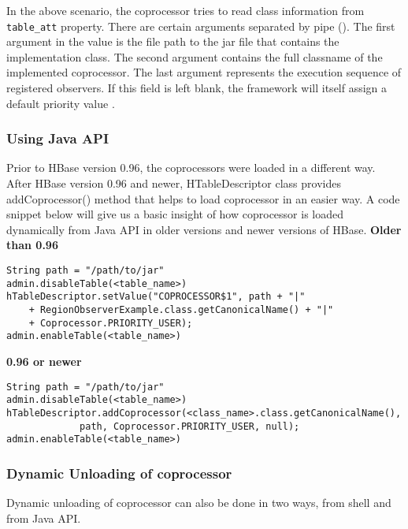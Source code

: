 \documentclass[11pt,a4paper,bibtotoc,idxtotoc,headsepline,footsepline,footexclude,BCOR12mm,DIV13]{scrbook}
\begin{document}
In the above scenario, the coprocessor tries to read class information from \texttt{table\_att} property. There are certain arguments separated by pipe (\text{\textbar}). The first argument in the value is the file path to the jar file that contains the implementation class. The second argument contains the full classname of the implemented coprocessor. The last argument represents the execution sequence of registered observers. If this field is left blank, the framework will itself assign a default priority value \cite{hbase:site}.

\subsubsection{Using Java API}
Prior to HBase version 0.96, the coprocessors were loaded in a different way. After HBase version 0.96 and newer, HTableDescriptor class provides addCoprocessor() method that helps to load coprocessor in an easier way. A code snippet \cite{loading:coprocessors} below will give us a basic insight of how coprocessor is loaded dynamically from Java API in older versions and newer versions of HBase.
\newline \newline
\textbf{Older than 0.96} \newline
\lstset{language=Java}
\begin{lstlisting}
String path = "/path/to/jar"
admin.disableTable(<table_name>)
hTableDescriptor.setValue("COPROCESSOR$1", path + "|"
    + RegionObserverExample.class.getCanonicalName() + "|"
    + Coprocessor.PRIORITY_USER);
admin.enableTable(<table_name>)
\end{lstlisting}

\textbf{0.96 or newer} \newline
\lstset{language=Java}
\begin{lstlisting}
String path = "/path/to/jar"
admin.disableTable(<table_name>)
hTableDescriptor.addCoprocessor(<class_name>.class.getCanonicalName(),
             path, Coprocessor.PRIORITY_USER, null);
admin.enableTable(<table_name>)
\end{lstlisting}

\subsubsection{Dynamic Unloading of coprocessor}
Dynamic unloading of coprocessor can also be done in two ways, from shell and from Java API. 
\end{document}
